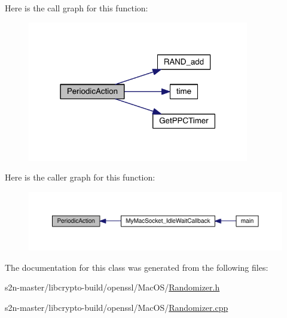 Here is the call graph for this function\+:
\nopagebreak
\begin{figure}[H]
\begin{center}
\leavevmode
\includegraphics[width=274pt]{class_c_randomizer_a106ea95e959a42130d3098ff0238327b_cgraph}
\end{center}
\end{figure}




Here is the caller graph for this function\+:\nopagebreak
\begin{figure}[H]
\begin{center}
\leavevmode
\includegraphics[width=350pt]{class_c_randomizer_a106ea95e959a42130d3098ff0238327b_icgraph}
\end{center}
\end{figure}




The documentation for this class was generated from the following files\+:\begin{DoxyCompactItemize}
\item 
s2n-\/master/libcrypto-\/build/openssl/\+Mac\+O\+S/\hyperlink{_randomizer_8h}{Randomizer.\+h}\item 
s2n-\/master/libcrypto-\/build/openssl/\+Mac\+O\+S/\hyperlink{_randomizer_8cpp}{Randomizer.\+cpp}\end{DoxyCompactItemize}

